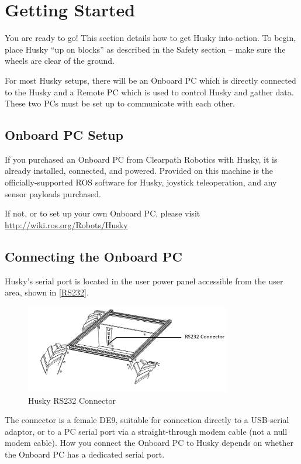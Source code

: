 \documentclass[]{clearpath-latex/clearpath-manual}
\begin{document}
\section{Getting Started}

You are ready to go! This section details how to get Husky into action.
To begin, place Husky “up on blocks” as described in the Safety section – make sure the wheels are clear of the ground.

For most Husky setups, there will be an Onboard PC which is directly connected to the Husky and a Remote PC which is used to control Husky and gather data. These two PCs must be set up to communicate with each other.


\subsection{Onboard PC Setup}

If you purchased an Onboard PC from Clearpath Robotics with Husky, it is already installed, connected, and powered. 
Provided on this machine is the officially-supported ROS software for Husky, joystick teleoperation, and any sensor payloads purchased.

If not, or to set up your own Onboard PC, please visit \url{http://wiki.ros.org/Robots/Husky}


\subsection{Connecting the Onboard PC}

Husky’s serial port is located in the user power panel accessible from the user area, shown in \autoref{RS232}.

\begin{figure}[h]
	\centering
	\includegraphics[width=0.8\textwidth]{RS232.png}
	\caption{Husky RS232 Connector}
	\label{RS232}
\end{figure}

The connector is a female DE9, suitable for connection directly to a USB-serial adaptor, 
or to a PC serial port via a straight-through modem cable (not a null modem cable). 
How you connect the Onboard PC to Husky depends on whether the Onboard PC has a dedicated serial port.
\end{document}
